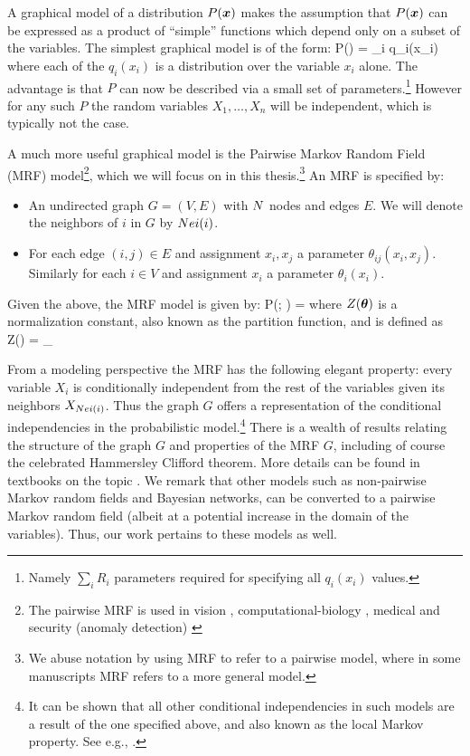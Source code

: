 A graphical model of a distribution $P(\boldsymbol{x})$ makes the assumption that $P(\boldsymbol{x})$ can be expressed as a product of ``simple'' functions which depend only on a subset of the variables. The simplest graphical model is of the form:
\be
P(\xx) = \prod_i q_i(x_i)
\label{eq:independent}
\ee
where each of the $q_i(x_i)$ is a distribution over the variable $x_i$ alone. The advantage is that $P$ can now be described via a small set of parameters.\footnote{Namely $\sum_i R_i$ parameters required for specifying all $q_i(x_i)$ values.} However for any such $P$ the random variables $X_1,\ldots,X_n$ will be independent, which is typically not the case.

A much more useful graphical model is the Pairwise Markov Random Field (MRF) model\footnote{The pairwise MRF is used in vision \cite{yao2010modeling}, computational-biology \cite{hopf2015quantification}, medical \cite{goodwin2015predictive} and security (anomaly detection) \cite{wang2015ddos}}, which we will focus on in this thesis.\footnote{We abuse notation by using MRF to refer to a pairwise model, where in some manuscripts MRF refers to a more general model.} An MRF is specified by:
\begin{itemize}
\item An undirected graph $G=(V,E)$ with $N$ nodes and edges $E$. We will denote the neighbors of $i$ in $G$ by $Nei(i)$.
\item For each edge $(i,j)\in E$ and assignment $x_i,x_j$ a parameter $\theta_{ij}(x_i,x_j)$. Similarly for each $i\in V$ and assignment $x_i$ a parameter $\theta_i(x_i)$. 
\end{itemize}  

Given the above, the MRF model is given by:
\be
\label{eq:basic_model}
P(\xx; \thetav) =  
\ee
where $Z(\boldsymbol{\theta})$ is a normalization constant, also known as the partition function, and is defined as 
\be
\label{eq:partition_function}
Z(\thetav) = \sum_{\xx \in\cX}
\ee

From a modeling perspective the MRF has the following elegant property: every variable $X_i$ is conditionally independent from the rest of the variables given its neighbors $X_{Nei(i)}$. Thus the graph $G$ offers a representation of the conditional independencies in the probabilistic model.\footnote{It can be shown that all other conditional independencies in such models are a result of the one specified above, and also known as the local Markov property. See e.g.,  \cite{koller2009probabilistic}.} There is a wealth of results relating the structure of the graph $G$ and properties of the MRF $G$, including of course the celebrated Hammersley Clifford theorem. More details can be found in textbooks on the topic  \cite{koller2009probabilistic}. We remark that other models such as non-pairwise Markov random fields and Bayesian networks, can be converted to a pairwise Markov random field (albeit at a potential increase in the domain of the variables). Thus, our work pertains to these models as well.

